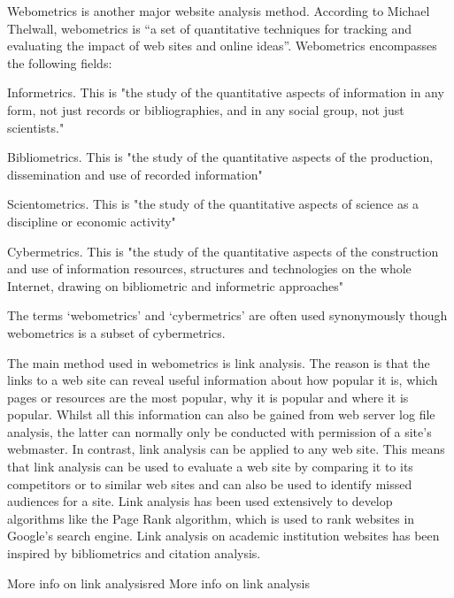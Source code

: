 \noindent
Webometrics is another major website analysis method. According to Michael Thelwall, webometrics is “a set of quantitative techniques for tracking and evaluating the impact of web sites and online ideas”. Webometrics encompasses the following fields:
\begin{list}{}{}
\item Informetrics. This is "the study of the quantitative aspects of information in any form, not just records or bibliographies, and in any social group, not just scientists."
\item Bibliometrics. This is "the study of the quantitative aspects of the production, dissemination and use of recorded information"
\item Scientometrics. This is "the study of the quantitative aspects of science as a discipline or
economic activity"
\item Cybermetrics. This is "the study of the quantitative aspects of the construction and use of information resources, structures and technologies on the whole Internet, drawing on bibliometric and informetric approaches"
\end{list}
The terms ‘webometrics’ and ‘cybermetrics’ are often used synonymously though webometrics is a subset of cybermetrics.

\noindent
The main method used in webometrics is link analysis. The reason is that the links to a web site can reveal useful information about how popular it is, which pages or resources are the most popular, why it is popular and where it is popular. Whilst all this information can also be gained from web server log file analysis, the latter can normally only be conducted with permission of a site’s webmaster. In contrast, link analysis can be applied to any web site. This means that link analysis can be used to evaluate a web site by comparing it to its competitors or to similar web sites and can also be used to identify missed audiences for a site. Link analysis has been used extensively to develop algorithms like the Page Rank algorithm, which is used to rank websites in Google’s search engine. Link analysis on academic institution websites has been inspired by bibliometrics and citation analysis.
\begin{review_comment}{More info on link analysis}{red}
{More info on link analysis}
\end{review_comment}

